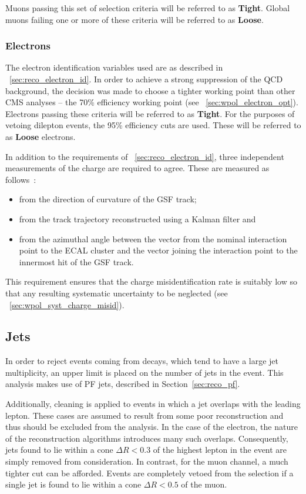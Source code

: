 Muons passing this set of selection criteria will be referred to as
\textbf{Tight}. Global muons failing one or more of these criteria will be
referred to as \textbf{Loose}.

\subsubsection{Electrons}
\label{sec:wpol_electronid}
The electron identification variables used are as described in
\sec~\ref{sec:reco_electron_id}. In order to achieve a strong suppression of the
\ac{QCD} background, the decision was made to choose a tighter working point
than other \ac{CMS} analyses -- the 70\% efficiency working point (see
\sec~\ref{sec:wpol_electron_opt}). Electrons passing these criteria will be
referred to as \textbf{Tight}. For the purposes of vetoing dilepton events, the
95\% efficiency cuts are used. These will be referred to as \textbf{Loose}
electrons.

In addition to the requirements of \sec~\ref{sec:reco_electron_id}, three independent
measurements of the charge are required to agree. These are measured as follows~\cite{wcharge_asymm2}:
\begin{itemize}
\item from the direction of curvature of the \ac{GSF} track;
\item from the track trajectory reconstructed using a Kalman filter and
\item from the azimuthal angle between the vector from the nominal interaction
  point to the \ac{ECAL} cluster and the vector joining the interaction point to
  the innermost hit of the \ac{GSF} track.
\end{itemize}
This requirement ensures that the charge misidentification rate is suitably low
so that any resulting systematic uncertainty to be neglected (see
\sec~\ref{sec:wpol_syst_charge_misid}).

\subsection{Jets}
\label{sec:wpol_jets}
In order to reject events coming from \ttbar decays, which tend to have a large
jet multiplicity, an upper limit is placed on the number of jets in the
event. This analysis makes use of \ac{PF} jets, described in
Section~\ref{sec:reco_pf}.

Additionally, cleaning is applied to events in which a jet overlaps with the
leading lepton. These cases are assumed to result from some poor reconstruction
and thus should be excluded from the analysis. In the case of the electron, the
nature of the reconstruction algorithms introduces many such
overlaps. Consequently, jets found to lie within a cone $\Delta R < 0.3$ of the
highest \Pt lepton in the event are simply removed from consideration. In
contrast, for the muon channel, a much tighter cut can be afforded. Events are
completely vetoed from the selection if a single jet is found to lie within a
cone $\Delta R < 0.5$ of the muon.

